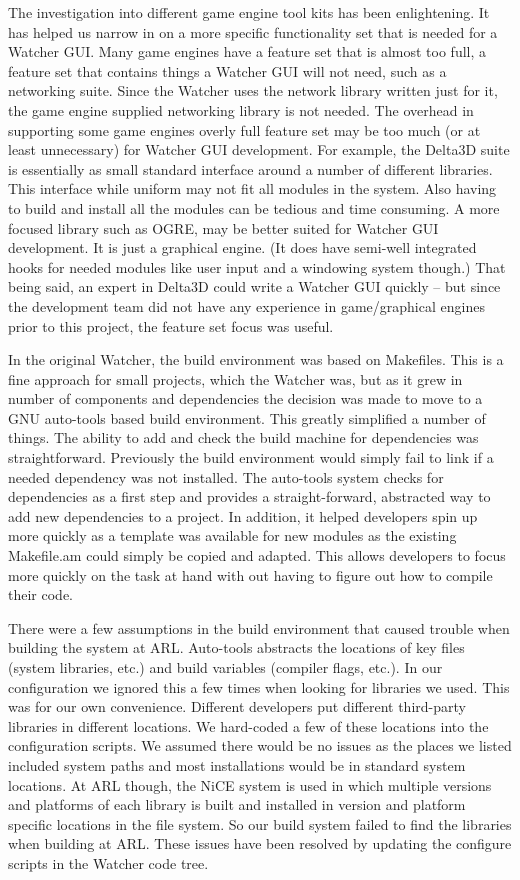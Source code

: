 \documentclass{report}
\begin{document}
The investigation into different game engine tool kits has been enlightening. It has helped us narrow in on a more specific functionality set that is needed
for a Watcher GUI. Many game engines have a feature set that is almost too full, a feature set that contains things a Watcher GUI will not need, such as 
a networking suite. Since the Watcher uses the network library written just for it, the game engine supplied networking library is not needed. The overhead in supporting 
some game engines overly full
feature set may be too much (or at least unnecessary) for Watcher GUI development. For example, the Delta3D suite is essentially as small standard 
interface around a number of different libraries. This interface while uniform may not fit all modules in the system. Also having to build and install
all the modules can be tedious and time consuming. A more focused library such as OGRE, may be better suited for Watcher GUI development. It is just 
a graphical engine. (It does have semi-well integrated hooks for needed modules like user input and a windowing system though.) That being said, an expert 
in Delta3D could write a Watcher GUI quickly -- but since the development team did not have any experience in game\slash graphical engines prior to 
this project, the feature set focus was useful. 

In the original Watcher, the build environment was based on Makefiles. This is a fine approach for small projects, which the Watcher was, but as it grew
in number of components and dependencies the decision was made to move to a GNU auto-tools based build environment. This greatly simplified a number
of things. The ability to add and check the build machine for dependencies was straightforward. Previously the build environment would simply fail to link
if a needed dependency was not installed. The auto-tools system checks for dependencies as a first step and provides a straight-forward, abstracted way 
to add new dependencies to a project. In addition, it helped developers spin up more quickly as a template was available for new modules as the existing
Makefile.am could simply be copied and adapted. This allows developers to focus more quickly on the task at hand with out having to figure out how to 
compile their code. 

There were a few assumptions in the build environment that caused trouble when building the system at ARL. Auto-tools abstracts the locations
of key files (system libraries, etc.) and build variables (compiler flags, etc.). In our configuration we ignored this a few times when looking 
for libraries we used. This was for our own convenience. Different developers put different third-party libraries in different locations. We hard-coded
a few of these locations into the configuration scripts. We assumed there would be no issues as the places we listed included system paths and most
installations would be in standard system locations. At ARL though, the NiCE system is used in which multiple versions and platforms of each library
is built and installed in version and platform specific locations in the file system. So our build system failed to find the libraries when building 
at ARL. These issues have been resolved by updating the configure scripts in the Watcher code tree. 
\end{document}

